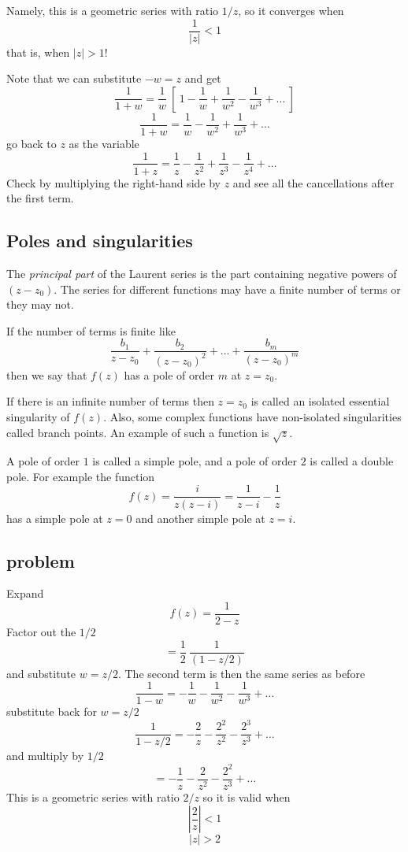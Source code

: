 \documentclass[11pt, oneside]{article}   	%
\begin{document}
Namely, this is a geometric series with ratio $1/z$, so it converges when 
\[ \frac{1}{|z|} < 1 \]
that is, when $|z| > 1$!

Note that we can substitute $-w = z$ and get
\[ \frac{1}{1+w} =  \frac{1}{w} \ [ \ 1 - \frac{1}{w} + \frac{1}{w^2} - \frac{1}{w^3} + \dots \ ] \]
\[ \frac{1}{1+w} =  \frac{1}{w} - \frac{1}{w^2} + \frac{1}{w^3} + \dots \]
go back to $z$ as the variable
\[ \frac{1}{1+z} =  \frac{1}{z} - \frac{1}{z^2} + \frac{1}{z^3} - \frac{1}{z^4} + \dots \]
Check by multiplying the right-hand side by $z$ and see all the cancellations after the first term.

\subsection*{Poles and singularities}
The \emph{principal part} of the Laurent series is the part containing negative powers of $(z - z_0)$.  The series for different functions may have a finite number of terms or they may not.  

If the number of terms is finite like
\[ \frac{b_1}{z-z_0} + \frac{b_2}{(z-z_0)^2} + \dots + \frac{b_m}{(z-z_0)^m} \]
then we say that $f(z)$ has a pole of order $m$ at $ z = z_0$.

If there is an infinite number of terms then $z = z_0$ is called an isolated essential singularity of $f(z)$.  Also, some complex functions have non-isolated singularities called branch points. An example of such a function is $\sqrt{z}$.

A pole of order $1$ is called a simple pole, and a pole of order $2$ is called a double pole.  For example the function
\[ f(z) = \frac{i}{z(z-i)} = \frac{1}{z-i} - \frac{1}{z} \]
has a simple pole at $z = 0$ and another simple pole at $z = i$.  

\subsection*{problem}
Expand 
\[ f(z) = \frac{1}{2 - z} \]
Factor out the $1/2$ 
\[ = \frac{1}{2} \ \frac{1}{(1 - z/2)} \]
and substitute $w = z/2$.  The second term is then the same series as before
\[ \frac{1}{1-w} = - \frac{1}{w} - \frac{1}{w^2} - \frac{1}{w^3} + \dots \]
substitute back for $w = z/2$
\[ \frac{1}{1 - z/2} = - \frac{2}{z} - \frac{2^2}{z^2} - \frac{2^3}{z^3} + \dots \]
and multiply by $1/2$
\[ = - \frac{1}{z} - \frac{2}{z^2} - \frac{2^2}{z^3} + \dots \]
This is a geometric series with ratio $2/z$ so it is valid when
\[ | \frac{2}{z}|  < 1 \]
\[ |z| > 2 \]
\end{document}
